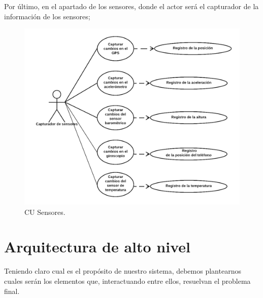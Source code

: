 \documentclass[12pt,a4paper,oneside]{book} %
\begin{document}
Por último, en el apartado de los sensores, donde el actor será el capturador de la información de los sensores; 
\begin{figure}[H]
	\begin{center}
		\includegraphics[scale=0.30]{pictures/usecases/usecases06.png} %
	\end{center}
	\caption[Casos de uso 06]{CU Sensores.}
\end{figure}
\pagebreak
\section{Arquitectura de alto nivel}
Teniendo claro cual es el propósito de nuestro sistema, debemos plantearnos cuales serán los elementos que, interactuando entre ellos, resuelvan el problema final. 
\newline 
\newline
 
\end{document}
